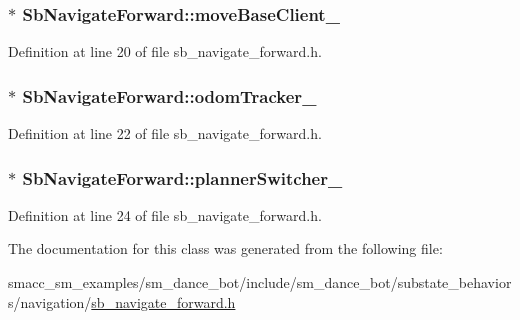 \subsubsection[{\texorpdfstring{move\+Base\+Client\+\_\+}{moveBaseClient_}}]{$\ast$ Sb\+Navigate\+Forward\+::move\+Base\+Client\+\_\+}\hypertarget{classSbNavigateForward_a6c3b305bdf4a637dad4d80b456575a36}{}\label{classSbNavigateForward_a6c3b305bdf4a637dad4d80b456575a36}


Definition at line 20 of file sb\+\_\+navigate\+\_\+forward.\+h.

\subsubsection[{\texorpdfstring{odom\+Tracker\+\_\+}{odomTracker_}}]{$\ast$ Sb\+Navigate\+Forward\+::odom\+Tracker\+\_\+}\hypertarget{classSbNavigateForward_ac45353a2cfde3c3d2c802065ed1419fc}{}\label{classSbNavigateForward_ac45353a2cfde3c3d2c802065ed1419fc}


Definition at line 22 of file sb\+\_\+navigate\+\_\+forward.\+h.

\subsubsection[{\texorpdfstring{planner\+Switcher\+\_\+}{plannerSwitcher_}}]{$\ast$ Sb\+Navigate\+Forward\+::planner\+Switcher\+\_\+}\hypertarget{classSbNavigateForward_afdb6dba7135fa431ef14bf7a7b6cee09}{}\label{classSbNavigateForward_afdb6dba7135fa431ef14bf7a7b6cee09}


Definition at line 24 of file sb\+\_\+navigate\+\_\+forward.\+h.



The documentation for this class was generated from the following file\+:\begin{DoxyCompactItemize}
\item 
smacc\+\_\+sm\+\_\+examples/sm\+\_\+dance\+\_\+bot/include/sm\+\_\+dance\+\_\+bot/substate\+\_\+behaviors/navigation/\hyperlink{sb__navigate__forward_8h}{sb\+\_\+navigate\+\_\+forward.\+h}\end{DoxyCompactItemize}
